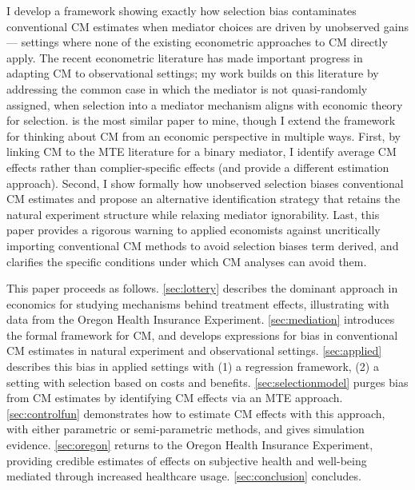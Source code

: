 I develop a framework showing exactly how selection bias contaminates conventional CM estimates when mediator choices are driven by unobserved gains --- settings where none of the existing econometric approaches to CM directly apply.
The recent econometric literature has made important progress in adapting CM to observational settings;
my work builds on this literature by addressing the common case in which the mediator is not quasi-randomly assigned, when selection into a mediator mechanism aligns with economic theory for selection.
\cite{frolich2017direct} is the most similar paper to mine, though I extend the framework for thinking about CM from an economic perspective in multiple ways.
First, by linking CM to the MTE literature for a binary mediator, I identify average CM effects rather than complier-specific effects (and provide a different estimation approach).
Second, I show formally how unobserved selection biases conventional CM estimates and propose an alternative identification strategy that retains the natural experiment structure while relaxing mediator ignorability.
Last, this paper provides a rigorous warning to applied economists against uncritically importing conventional CM methods to avoid selection biases term derived, and clarifies the specific conditions under which CM analyses can avoid them.

This paper proceeds as follows.
\autoref{sec:lottery} describes the dominant approach in economics for studying mechanisms behind treatment effects, illustrating with data from the Oregon Health Insurance Experiment.
\autoref{sec:mediation} introduces the formal framework for CM, and develops expressions for bias in conventional CM estimates in natural experiment and observational settings.
\autoref{sec:applied} describes this bias in applied settings with (1) a regression framework, (2) a setting with selection based on costs and benefits.
\autoref{sec:selectionmodel} purges bias from CM estimates by identifying CM effects via an MTE approach.
\autoref{sec:controlfun} demonstrates how to estimate CM effects with this approach, with either parametric or semi-parametric methods, and gives simulation evidence.
\autoref{sec:oregon} returns to the Oregon Health Insurance Experiment, providing credible estimates of effects on subjective health and well-being mediated through increased healthcare usage.
\autoref{sec:conclusion} concludes.
